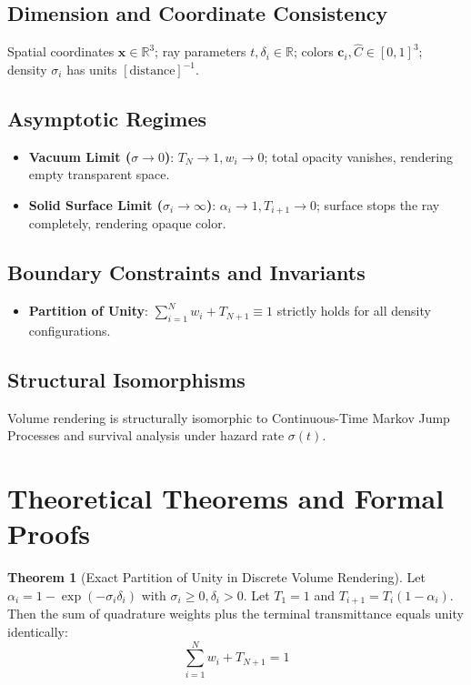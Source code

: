 \documentclass[11pt,a4paper]{article}
\theoremstyle{definition}
\newtheorem{theorem}{\textbf{Theorem}}[section]
\begin{document}
\subsection{Dimension and Coordinate Consistency}
Spatial coordinates $\mathbf{x} \in \mathbb{R}^3$; ray parameters $t, \delta_i \in \mathbb{R}$; colors $\mathbf{c}_i, \hat{C} \in [0, 1]^3$; density $\sigma_i$ has units $[\text{distance}]^{-1}$.

\subsection{Asymptotic Regimes}
\begin{itemize}
    \item \textbf{Vacuum Limit ($\sigma \to 0$)}: $T_N \to 1, w_i \to 0$; total opacity vanishes, rendering empty transparent space.
    \item \textbf{Solid Surface Limit ($\sigma_i \to \infty$)}: $\alpha_i \to 1, T_{i+1} \to 0$; surface stops the ray completely, rendering opaque color.
\end{itemize}

\subsection{Boundary Constraints and Invariants}
\begin{itemize}
    \item \textbf{Partition of Unity}: $\sum_{i=1}^N w_i + T_{N+1} \equiv 1$ strictly holds for all density configurations.
\end{itemize}

\subsection{Structural Isomorphisms}
Volume rendering is structurally isomorphic to Continuous-Time Markov Jump Processes and survival analysis under hazard rate $\sigma(t)$.

\section{Theoretical Theorems and Formal Proofs}

\begin{theorem}[Exact Partition of Unity in Discrete Volume Rendering]
Let $\alpha_i = 1 - \exp(-\sigma_i \delta_i)$ with $\sigma_i \ge 0, \delta_i > 0$. Let $T_1 = 1$ and $T_{i+1} = T_i (1 - \alpha_i)$. Then the sum of quadrature weights plus the terminal transmittance equals unity identically:
{\boldmath
\begin{equation}
\sum_{i=1}^N w_i + T_{N+1} = 1
\end{equation}
}
\end{theorem}
\end{document}
